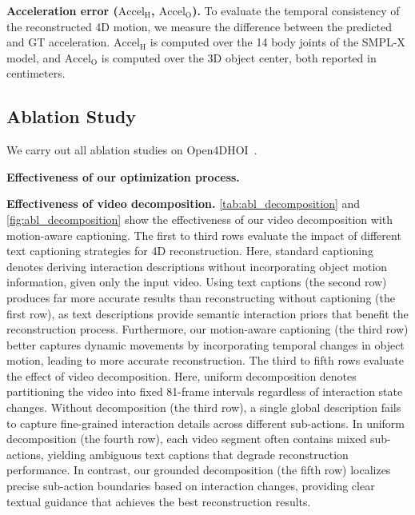 \noindent\textbf{Acceleration error ($\text{Accel}_{\text{H}}$, $\text{Accel}_{\text{O}}$).}
To evaluate the temporal consistency of the reconstructed 4D motion, we measure the difference between the predicted and GT acceleration.
$\text{Accel}_{\text{H}}$ is computed over the 14 body joints of the SMPL-X model, and $\text{Accel}_{\text{O}}$ is computed over the 3D object center, both reported in centimeters.


\subsection{Ablation Study}
We carry out all ablation studies on Open4DHOI~\cite{wen2025efficient}.


\noindent\textbf{Effectiveness of our optimization process.}


\noindent\textbf{Effectiveness of video decomposition.}
\cref{tab:abl_decomposition} and \cref{fig:abl_decomposition} show the effectiveness of our video decomposition with motion-aware captioning.
The first to third rows evaluate the impact of different text captioning strategies for 4D reconstruction.
Here, standard captioning denotes deriving interaction descriptions without incorporating object motion information, given only the input video.
Using text captions (the second row) produces far more accurate results than reconstructing without captioning (the first row), as text descriptions provide semantic interaction priors that benefit the reconstruction process.
Furthermore, our motion-aware captioning (the third row) better captures dynamic movements by incorporating temporal changes in object motion, leading to more accurate reconstruction.
The third to fifth rows evaluate the effect of video decomposition. %
Here, uniform decomposition denotes partitioning the video into fixed 81-frame intervals regardless of interaction state changes.
Without decomposition (the third row), a single global description fails to capture fine-grained interaction details across different sub-actions.
In uniform decomposition (the fourth row), each video segment often contains mixed sub-actions, yielding ambiguous text captions that degrade reconstruction performance.
In contrast, our grounded decomposition (the fifth row) localizes precise sub-action boundaries based on interaction changes, providing clear textual guidance that achieves the best reconstruction results.



